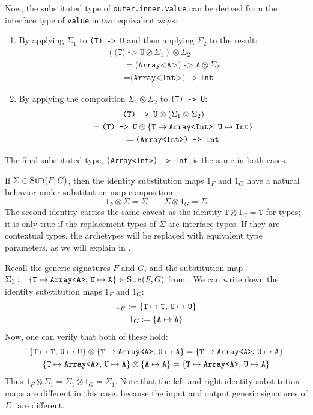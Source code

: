 \documentclass[../generics]{subfiles}
\begin{document}
\begin{example}
Now, the substituted type of \texttt{outer.inner.value} can be derived from the interface type of \texttt{value} in two equivalent ways:
\begin{enumerate}
\item By applying $\Sigma_1$ to \verb|(T) -> U| and then applying $\Sigma_2$ to the result:
\begin{gather*}
(\texttt{(T) -> U}\otimes\Sigma_1)\otimes \Sigma_2\\
\qquad {} = \texttt{(Array<A>) -> A}\otimes \Sigma_2\\
\qquad {} = \texttt{(Array<Int>) -> Int}
\end{gather*}
\item By applying the composition $\Sigma_1\otimes\Sigma_2$ to \texttt{(T) -> U}:
\begin{gather*}
\texttt{(T) -> U}\otimes(\Sigma_1\otimes \Sigma_2)\\
\qquad {} = \texttt{(T) -> U}\otimes \{ \texttt{T} \mapsto \texttt{Array<Int>},\,\texttt{U} \mapsto \texttt{Int} \}\\
\qquad {} = \texttt{(Array<Int>) -> Int}
\end{gather*}
\end{enumerate}
The final substituted type, \texttt{(Array<Int>) -> Int}, is the same in both cases.
\end{example}
If $\Sigma\in\textsc{Sub}({F, G})$, then the identity substitution maps $1_F$ and $1_G$ have a natural behavior under substitution map composition:
\[1_F\otimes\Sigma = \Sigma\qquad\Sigma\otimes 1_G = \Sigma\]
The second identity carries the same caveat as the identity $\texttt{T}\otimes 1_G=\texttt{T}$ for types; it is only true if the replacement types of $\Sigma$ are interface types. If they are contextual types, the archetypes will be replaced with equivalent type parameters, as we will explain in .
\begin{example}
Recall the generic signatures $F$ and $G$, and the substitution map $\Sigma_1 := \{ \texttt{T} \mapsto \texttt{Array<A>},\,\texttt{U} \mapsto \texttt{A} \}\in\textsc{Sub}({F, G})$ from . We can write down the identity substitution maps $1_F$ and $1_G$:
\begin{gather*}
1_F := \{\texttt{T} \mapsto \texttt{T},\,\texttt{U} \mapsto \texttt{U}\}\\
1_G := \{\texttt{A} \mapsto \texttt{A}\}
\end{gather*}
Now, one can verify that both of these hold:
\begin{gather*}
\{\texttt{T} \mapsto \texttt{T},\,\texttt{U} \mapsto \texttt{U}\}\otimes\{ \texttt{T} \mapsto \texttt{Array<A>},\,\texttt{U} \mapsto \texttt{A} \}=\{ \texttt{T} \mapsto \texttt{Array<A>},\,\texttt{U} \mapsto \texttt{A} \}\\
\{ \texttt{T} \mapsto \texttt{Array<A>},\,\texttt{U} \mapsto \texttt{A} \}\otimes\{\texttt{A} \mapsto \texttt{A}\}=\{ \texttt{T} \mapsto \texttt{Array<A>},\,\texttt{U} \mapsto \texttt{A} \}
\end{gather*}
Thus $1_F\otimes\Sigma_1 = \Sigma_1\otimes 1_G=\Sigma_1$. Note that the left and right identity substitution maps are different in this case, because the input and output generic signatures of $\Sigma_1$ are different.
\end{example}
\end{document}
